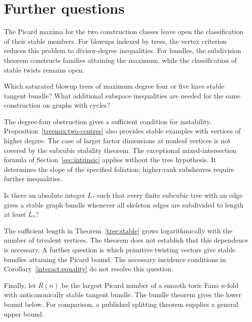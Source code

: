 \section{Further questions}\label{sec:questions}

The Picard maxima for the two construction classes leave open the
classification of their stable members. For blowups indexed by trees,
the vertex criterion reduces this problem to divisor-degree inequalities.
For bundles, the subdivision theorem constructs families attaining
the maximum, while the classification of stable twists remains open.

\begin{question}
Which saturated blowup trees of maximum degree four or five have
stable tangent bundle? What additional subspace inequalities are needed
for the same construction on graphs with cycles?
\end{question}

The degree-four obstruction gives a sufficient condition for instability.
Proposition~\ref{treemix:two-centres} also provides stable examples with
vertices of higher degree. The case of larger factor dimensions at
nonleaf vertices is not covered by the subcubic stability theorem.
The exceptional mixed-intersection formula of Section~\ref{sec:intrinsic}
applies without the tree hypothesis. It determines the slope of the
specified foliation; higher-rank subsheaves require further inequalities.

\begin{question}
Is there an absolute integer $L_*$ such that every finite subcubic
tree with an edge gives a stable graph bundle whenever all skeleton
edges are subdivided to length at least $L_*$?
\end{question}

The sufficient length in Theorem~\ref{tree:stable} grows logarithmically
with the number of trivalent vertices. The theorem does not establish
that this dependence is necessary. A further question is which primitive twisting
vectors give stable bundles attaining the Picard bound. The necessary
incidence conditions in Corollary~\ref{interact:equality} do not resolve
this question.

Finally, let $R(n)$ be the largest Picard number of a smooth toric
Fano $n$-fold with anticanonically stable tangent bundle. The bundle
theorem gives the lower bound below. For comparison, a published
splitting theorem supplies a general upper bound.

